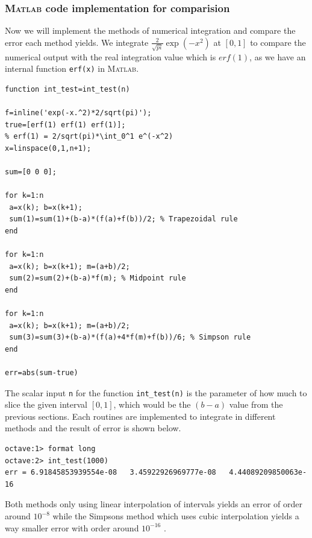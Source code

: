 \documentclass[paper=a4, fontsize=11pt]{scrartcl}
\newcommand{\MATLAB}{\textsc{Matlab}\xspace}
\begin{document}
\vspace{0.15in}
\subsubsection{\MATLAB code implementation for comparision}
\vspace{0.15in}

Now we will implement the methods of numerical integration and compare the error each method yields. We integrate $\frac{2}{\sqrt{pi}}\exp(-x^2)$ at $[0,1]$ to compare the numerical output with the real integration value which is $erf(1)$, as we have an internal function \texttt{erf(x)} in \MATLAB. \\

\begin{lstlisting}[caption = 'int\_test.m']
function int_test=int_test(n)

f=inline('exp(-x.^2)*2/sqrt(pi)');
true=[erf(1) erf(1) erf(1)];
% erf(1) = 2/sqrt(pi)*\int_0^1 e^(-x^2)
x=linspace(0,1,n+1);

sum=[0 0 0];

for k=1:n
 a=x(k); b=x(k+1); 
 sum(1)=sum(1)+(b-a)*(f(a)+f(b))/2; % Trapezoidal rule
end

for k=1:n
 a=x(k); b=x(k+1); m=(a+b)/2; 
 sum(2)=sum(2)+(b-a)*f(m); % Midpoint rule
end

for k=1:n
 a=x(k); b=x(k+1); m=(a+b)/2;
 sum(3)=sum(3)+(b-a)*(f(a)+4*f(m)+f(b))/6; % Simpson rule
end

err=abs(sum-true)
\end{lstlisting}
\vspace{0.15in}

The scalar input \texttt{n} for the function \texttt{int\_test(n)} is the parameter of how much to slice the given interval $[0,1]$, which would be the $(b-a)$ value from the previous sections. Each routines are implemented to integrate in different methods and the result of error is shown below.

\begin{verbatim}
octave:1> format long
octave:2> int_test(1000)
err = 6.91845853939554e-08   3.45922926969777e-08   4.44089209850063e-16	
\end{verbatim}

Both methods only using linear interpolation of intervals yields an error of order around $10^{-8}$ while the Simpsons method which uses cubic interpolation yields a way smaller error with order around $10^{-16}$ .

\vspace{0.15in}
\end{document}
